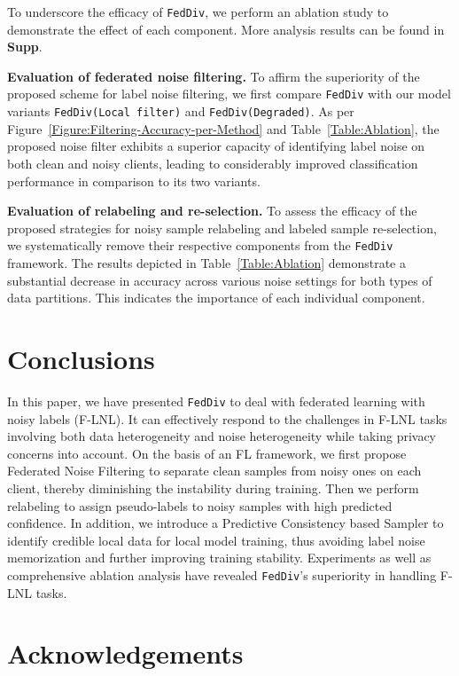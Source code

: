 \documentclass[letterpaper]{article} %
\begin{document}
To underscore the efficacy of \texttt{FedDiv}, we perform an ablation study to demonstrate the effect of each component. More analysis results can be found in \textbf{Supp}.

\noindent
\textbf{Evaluation of federated noise filtering.}
To affirm the superiority of the proposed scheme for label noise filtering, we first compare \texttt{FedDiv} with our model variants \texttt{FedDiv(Local filter)} and \texttt{FedDiv(Degraded)}. As per Figure~{\ref{Figure:Filtering-Accuracy-per-Method}} and Table~{\ref{Table:Ablation}}, the proposed noise filter exhibits a superior capacity of identifying label noise on both clean and noisy clients, leading to considerably improved classification performance in comparison to its two variants.
 
\noindent
\textbf{Evaluation of relabeling and re-selection.} 
To assess the efficacy of the proposed strategies for noisy sample relabeling and labeled sample re-selection, we systematically remove their respective components from the \texttt{FedDiv} framework.  The results depicted in Table~{\ref{Table:Ablation}} demonstrate a substantial decrease in accuracy across various noise settings for both types of data partitions. This indicates the importance of each individual component. 

\section{Conclusions}

In this paper, we have presented \texttt{FedDiv} to deal with federated learning with noisy labels (F-LNL). It can effectively respond to the challenges in F-LNL tasks involving both data heterogeneity and noise heterogeneity while taking privacy concerns into account. On the basis of an FL framework, we first propose Federated Noise Filtering to separate clean samples from noisy ones on each client, thereby diminishing the instability during training. Then we perform relabeling to assign pseudo-labels to noisy samples with high predicted confidence. In addition, we introduce a Predictive Consistency based Sampler to identify credible local data for local model training, thus avoiding label noise memorization and further improving training stability. Experiments as well as comprehensive ablation analysis have revealed \texttt{FedDiv}'s superiority in handling F-LNL tasks.

\section{Acknowledgements}
\end{document}
